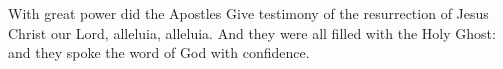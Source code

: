 With great power did the Apostles
\versseparator
Give testimony of the resurrection of Jesus Christ our Lord, alleluia, alleluia.
\versseparator
And they were all filled with the Holy Ghost: and they spoke the word of God with confidence.
